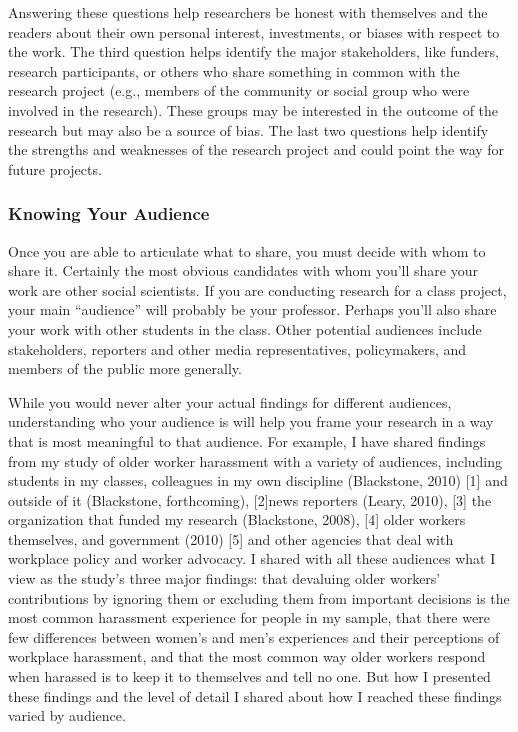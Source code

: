 Answering these questions help researchers be honest with themselves and the readers about their own personal interest, investments, or biases with respect to the work. The third question helps identify the major stakeholders, like funders, research participants, or others who share something in common with the research project (e.g., members of the community or social group who were involved in the research). These groups may be interested in the outcome of the research but may also be a source of bias. The last two questions help identify the strengths and weaknesses of the research project and could point the way for future projects.

\subsubsection{Knowing Your Audience}

Once you are able to articulate what to share, you must decide with whom to share it. Certainly the most obvious candidates with whom you’ll share your work are other social scientists. If you are conducting research for a class project, your main “audience” will probably be your professor. Perhaps you’ll also share your work with other students in the class. Other potential audiences include stakeholders, reporters and other media representatives, policymakers, and members of the public more generally.

While you would never alter your actual findings for different audiences, understanding who your audience is will help you frame your research in a way that is most meaningful to that audience. For example, I have shared findings from my study of older worker harassment with a variety of audiences, including students in my classes, colleagues in my own discipline (Blackstone, 2010) [1] and outside of it (Blackstone, forthcoming), [2]news reporters (Leary, 2010), [3] the organization that funded my research (Blackstone, 2008), [4] older workers themselves, and government (2010) [5] and other agencies that deal with workplace policy and worker advocacy. I shared with all these audiences what I view as the study’s three major findings: that devaluing older workers’ contributions by ignoring them or excluding them from important decisions is the most common harassment experience for people in my sample, that there were few differences between women’s and men’s experiences and their perceptions of workplace harassment, and that the most common way older workers respond when harassed is to keep it to themselves and tell no one. But how I presented these findings and the level of detail I shared about how I reached these findings varied by audience.

